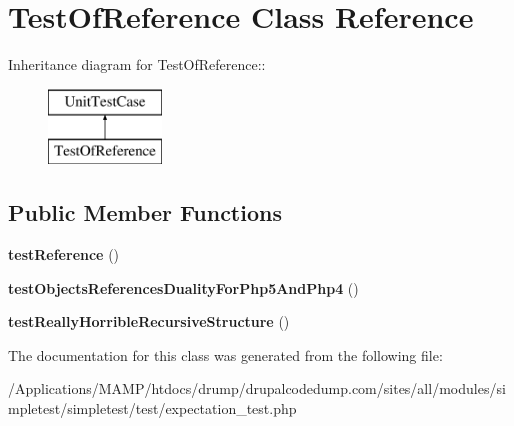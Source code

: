 \hypertarget{class_test_of_reference}{
\section{TestOfReference Class Reference}
\label{class_test_of_reference}
}
Inheritance diagram for TestOfReference::\begin{figure}[H]
\begin{center}
\leavevmode
\includegraphics[height=2cm]{class_test_of_reference}
\end{center}
\end{figure}
\subsection*{Public Member Functions}
\begin{DoxyCompactItemize}
\item 
\hypertarget{class_test_of_reference_a33f09a600f471461977eec49627229b5}{
{\bfseries testReference} ()}
\label{class_test_of_reference_a33f09a600f471461977eec49627229b5}

\item 
\hypertarget{class_test_of_reference_a1a60f717b8fb1be90a48615eeaf431e0}{
{\bfseries testObjectsReferencesDualityForPhp5AndPhp4} ()}
\label{class_test_of_reference_a1a60f717b8fb1be90a48615eeaf431e0}

\item 
\hypertarget{class_test_of_reference_ab0a123c325ec7ec800a2ec9141ec944c}{
{\bfseries testReallyHorribleRecursiveStructure} ()}
\label{class_test_of_reference_ab0a123c325ec7ec800a2ec9141ec944c}

\end{DoxyCompactItemize}


The documentation for this class was generated from the following file:\begin{DoxyCompactItemize}
\item 
/Applications/MAMP/htdocs/drump/drupalcodedump.com/sites/all/modules/simpletest/simpletest/test/expectation\_\-test.php\end{DoxyCompactItemize}
